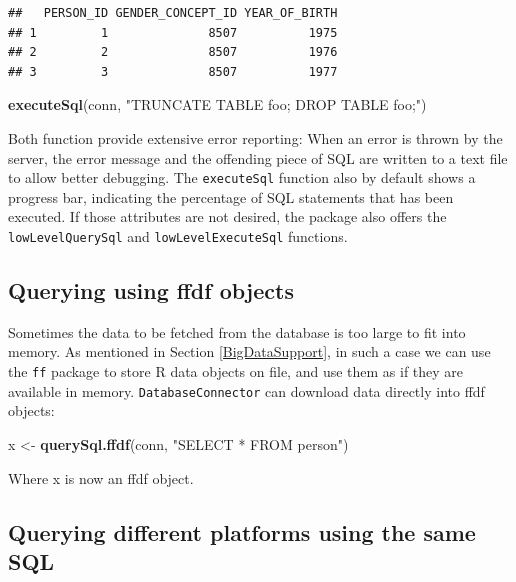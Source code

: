 \documentclass[11pt]{book}
\newenvironment{Shaded}{\begin{snugshade}}{\end{snugshade}}
\newcommand{\KeywordTok}[1]{\textcolor[rgb]{0.13,0.29,0.53}{\textbf{#1}}}
\newcommand{\StringTok}[1]{\textcolor[rgb]{0.31,0.60,0.02}{#1}}
\newcommand{\NormalTok}[1]{#1}
\begin{document}
\begin{verbatim}
##   PERSON_ID GENDER_CONCEPT_ID YEAR_OF_BIRTH
## 1         1              8507          1975
## 2         2              8507          1976
## 3         3              8507          1977
\end{verbatim}

\begin{Shaded}
\begin{Highlighting}[]
\KeywordTok{executeSql}\NormalTok{(conn, }\StringTok{"TRUNCATE TABLE foo; DROP TABLE foo;"}\NormalTok{)}
\end{Highlighting}
\end{Shaded}

Both function provide extensive error reporting: When an error is thrown
by the server, the error message and the offending piece of SQL are
written to a text file to allow better debugging. The
\texttt{executeSql} function also by default shows a progress bar,
indicating the percentage of SQL statements that has been executed. If
those attributes are not desired, the package also offers the
\texttt{lowLevelQuerySql} and \texttt{lowLevelExecuteSql} functions.

\subsection{Querying using ffdf
objects}\label{querying-using-ffdf-objects}

Sometimes the data to be fetched from the database is too large to fit
into memory. As mentioned in Section \ref{BigDataSupport}, in such a
case we can use the \texttt{ff} package to store R data objects on file,
and use them as if they are available in memory.
\texttt{DatabaseConnector} can download data directly into ffdf objects:

\begin{Shaded}
\begin{Highlighting}[]
\NormalTok{x <-}\StringTok{ }\KeywordTok{querySql.ffdf}\NormalTok{(conn, }\StringTok{"SELECT * FROM person"}\NormalTok{)}
\end{Highlighting}
\end{Shaded}

Where x is now an ffdf object.

\subsection{Querying different platforms using the same
SQL}\label{querying-different-platforms-using-the-same-sql}
\end{document}
